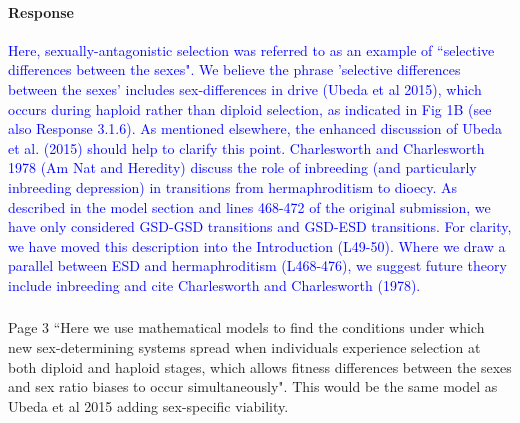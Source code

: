 \documentclass[10pt,letterpaper]{article}
\begin{document}
\noindent\paragraph{Response}
\textcolor{blue}{
Here, sexually-antagonistic selection was referred to as an example of ``selective differences between the sexes". 
We believe the phrase 'selective differences between the sexes' includes sex-differences in drive (Ubeda et al 2015), which occurs during haploid rather than diploid selection, as indicated in Fig 1B (see also Response 3.1.6).
As mentioned elsewhere, the enhanced discussion of Ubeda et al. (2015) should help to clarify this point. 
Charlesworth and Charlesworth 1978 (Am Nat and Heredity) discuss the role of inbreeding (and particularly inbreeding depression) in transitions from hermaphroditism to dioecy. 
As described in the model section and lines 468-472 of the original submission, we have only considered GSD-GSD transitions and GSD-ESD transitions.
For clarity, we have moved this description into the Introduction (L49-50). 
Where we draw a parallel between ESD and hermaphroditism (L468-476), we suggest future theory include inbreeding and cite Charlesworth and Charlesworth (1978). 
}

\noindent\subsubsection{}
Page 3 ``Here we use mathematical models to find the conditions under which new sex-determining systems spread when individuals experience selection at both diploid and haploid stages, which allows fitness differences between the sexes and sex ratio biases to occur simultaneously".
This would be the same model as Ubeda et al 2015 adding sex-specific viability.
\end{document}
